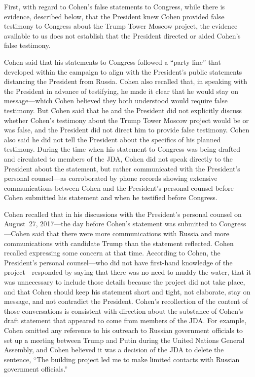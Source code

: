 First, with regard to Cohen's false statements to Congress, while there is evidence, described below, that the President knew Cohen provided false testimony to Congress about the Trump Tower Moscow project, the evidence available to us does not establish that the President directed or aided Cohen's false testimony.

Cohen said that his statements to Congress followed a ``party line'' that developed within the campaign to align with the President's public statements distancing the President from Russia.
Cohen also recalled that, in speaking with the President in advance of testifying, he made it clear that he would stay on message---which Cohen believed they both understood would require false testimony.
But Cohen said that he and the President did not explicitly discuss whether Cohen's testimony about the Trump Tower Moscow project would be or was false, and the President did not direct him to provide false testimony.
Cohen also said he did not tell the President about the specifics of his planned testimony.
During the time when his statement to Congress was being drafted and circulated to members of the JDA, Cohen did not speak directly to the President about the statement, but rather communicated with the President's personal counsel---as corroborated by phone records showing extensive communications between Cohen and the President's personal counsel before Cohen submitted his statement and when he testified before Congress.

Cohen recalled that in his discussions with the President's personal counsel on August~27, 2017---the day before Cohen's statement was submitted to Congress---Cohen said that there were more communications with Russia and more communications with candidate Trump than the statement reflected.
Cohen recalled expressing some concern at that time.
According to Cohen, the President's personal counsel---who did not have first-hand knowledge of the project---responded by saying that there was no need to muddy the water, that it was unnecessary to include those details because the project did not take place, and that Cohen should keep his statement short and tight, not elaborate, stay on message, and not contradict the President.
Cohen's recollection of the content of those conversations is consistent with direction about the substance of Cohen's draft statement that appeared to come from members of the JDA\null.
For example, Cohen omitted any reference to his outreach to Russian government officials to set up a meeting between Trump and Putin during the United Nations General Assembly, and Cohen believed it was a decision of the JDA to delete the sentence, ``The building project led me to make limited contacts with Russian government officials.''

